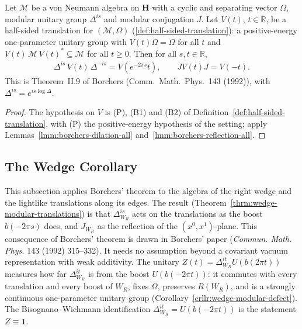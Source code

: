\begin{theorem}
    \label{thrm:borchers}
    \leanok
    Let $\mathcal{M}$ be a von Neumann algebra on $\mathbf{H}$ with a cyclic and separating vector $\Omega$, modular unitary group $\Delta^{is}$ and modular conjugation $J$. Let $V(t)$, $t \in \mathbb{R}$, be a half-sided translation for $(\mathcal{M}, \Omega)$ (\ref{def:half-sided-translation}): a positive-energy one-parameter unitary group with $V(t)\Omega = \Omega$ for all $t$ and $V(t)\,\mathcal{M}\,V(t)^* \subseteq \mathcal{M}$ for all $t \ge 0$. Then for all $s, t \in \mathbb{R}$,
    \begin{align}
        \Delta^{is}\,V(t)\,\Delta^{-is} = V(e^{-2\pi s}t), \qquad JV(t)J = V(-t).
    \end{align}
    This is Theorem~II.9 of Borchers (Comm.\ Math.\ Phys.\ 143 (1992)), with $\Delta^{is} = e^{is\log\Delta}$.
\end{theorem}
\begin{proof}
    \leanok
    The hypothesis on $V$ is (P), (B1) and (B2) of Definition~\ref{def:half-sided-translation}, with (P) the positive-energy hypothesis of the setting; apply Lemmas~\ref{lmm:borchers-dilation-all} and~\ref{lmm:borchers-reflection-all}.
\end{proof}

\subsection{The Wedge Corollary}\label{sbsctn:wedge-corollary}

This subsection applies Borchers' theorem to the algebra of the right wedge and the lightlike translations along its edges. The result (Theorem~\ref{thrm:wedge-modular-translations}) is that $\Delta_{W_R}^{is}$ acts on the translations as the boost $b(-2\pi s)$ does, and $J_{W_R}$ as the reflection of the $(x^0, x^1)$-plane. This consequence of Borchers' theorem is drawn in Borchers' paper (\emph{Commun. Math. Phys.} 143 (1992) 315--332). It needs no assumption beyond a covariant vacuum representation with weak additivity. The unitary $Z(t) = \Delta_{W_R}^{it}U(b(2\pi t))$ measures how far $\Delta_{W_R}^{it}$ is from the boost $U(b(-2\pi t))$: it commutes with every translation and every boost of $W_R$, fixes $\Omega$, preserves $R(W_R)$, and is a strongly continuous one-parameter unitary group (Corollary~\ref{crllr:wedge-modular-defect}). The Bisognano--Wichmann identification $\Delta_{W_R}^{it} = U(b(-2\pi t))$ is the statement $Z \equiv \mathbf{1}$.

